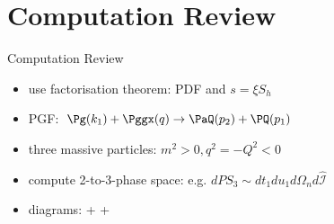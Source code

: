 \section{Computation Review}
\begin{frame}{Computation Review}
\begin{itemize}
\item use factorisation theorem: PDF and $s=\xi S_h$
\item PGF: $\Pg(k_1) + \Pggx(q) \to \PaQ(p_2) + \PQ(p_1)$
\item three massive particles: $m^2>0,q^2=-Q^2<0$
\item<2-> compute 2-to-3-phase space: e.g. $dPS_3 \sim dt_1du_1d\Omega_nd\hat{\mathcal{I}}$ 
\item<2-> diagrams: %
 +%
 + %

\end{itemize}
\end{frame}
